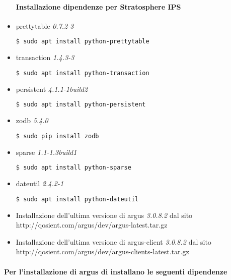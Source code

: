 \documentclass[11pt,a4paper,twoside,openright]{book}
\begin{document}
\begin{itemize}
				\paragraph{Installazione dipendenze per Stratosphere IPS}

				\item prettytable \textit{0.7.2-3}
\begin{lstlisting}[language=bash]
$ sudo apt install python-prettytable
\end{lstlisting}

				\item transaction \textit{1.4.3-3}
\begin{lstlisting}[language=bash]
$ sudo apt install python-transaction
\end{lstlisting}

				\item persistent \textit{4.1.1-1build2}
\begin{lstlisting}[language=bash]
$ sudo apt install python-persistent
\end{lstlisting}

				\item zodb \textit{5.4.0}
\begin{lstlisting}[language=bash]
$ sudo pip install zodb
\end{lstlisting}

				\item sparse \textit{1.1-1.3build1}
\begin{lstlisting}[language=bash]
$ sudo apt install python-sparse
\end{lstlisting}

				\item dateutil \textit{2.4.2-1}
\begin{lstlisting}[language=bash]
$ sudo apt install python-dateutil
\end{lstlisting}

				\item Installazione dell'ultima versione di argus \textit{3.0.8.2} dal sito http://qosient.com/argus/dev/argus-latest.tar.gz

				\item Installazione dell'ultima versione di argus-client \textit{3.0.8.2} dal sito http://qosient.com/argus/dev/argus-clients-latest.tar.gz

\end{itemize}

\paragraph{Per l'installazione di argus di installano le seguenti dipendenze}
\end{document}
